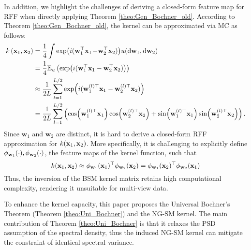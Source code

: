 In addition, we highlight the challenges of deriving a closed-form feature map for RFF when directly applying Theorem \ref{theo:Gen_Bochner_old}. According to Theorem \ref{theo:Gen_Bochner_old}, the kernel can be approximated via \MakeUppercase{mc} as follows:
\begin{equation}
\begin{aligned}
k\left({\mathbf x}_1, {\mathbf x}_2\right) &  = \frac{1}{4} \int \exp(i({\mathbf w}_1^{\top} {\mathbf x}_1 \! - \! {\mathbf w}_2^{\top} {\mathbf x}_2))  u(\mathrm{d}{\mathbf w}_1, \mathrm{d}{\mathbf w}_2) \\
&= \frac{1}{4} \mathbb{E}_u \left( \exp(i({\mathbf w}_1^{\top} {\mathbf x}_1 - {\mathbf w}_2^{\top} {\mathbf x}_2)) \right)\\
&\approx \frac{1}{2 L} \sum_{l=1}^{L/2} \exp(i({\mathbf w}_1^{(l)\top} {\mathbf x}_1 - {\mathbf w}_2^{(l)\top} {\mathbf x}_2))  \\
&= \frac{1}{2 L} \sum_{l=1}^{L/2} \left(\cos({\mathbf w}_{1}^{(l)\top} {\mathbf x}_1)\cos({\mathbf w}_{2}^{(l)\top} {\mathbf x}_2) + \sin({\mathbf w}_{1}^{(l)\top} {\mathbf x}_1)\sin({\mathbf w}_{2}^{(l)\top} {\mathbf x}_2) \right).
\end{aligned}
\end{equation}
Since \(\mathbf{w}_1\) and \(\mathbf{w}_2\) are distinct, it is hard to derive a closed-form  RFF approximation for $k({\mathbf x}_1, {\mathbf x}_2)$. More specifically, it is challenging to explicitly define $\phi_{{\mathbf w}_1}(\cdot), \phi_{{\mathbf w}_2}(\cdot)$, the feature maps of the kernel function, such that 
\begin{equation}
    k({\mathbf x}_1, {\mathbf x}_2) \approx \phi_{{\mathbf w}_1}({\mathbf x}_1)^\top \phi_{{\mathbf w}_2}({\mathbf x}_2) = \phi_{{\mathbf w}_1}({\mathbf x}_2)^\top \phi_{{\mathbf w}_2}({\mathbf x}_1)
\end{equation}
Thus, the inversion of the \MakeUppercase{bsm} kernel matrix retains high computational complexity, rendering it unsuitable for multi-view data. 

\begin{remark}
    To enhance the kernel capacity, this paper proposes the Universal Bochner’s Theorem (Theorem \ref{theo:Uni_Bochner}) and the NG-SM kernel.  The main contribution of Theorem \ref{theo:Uni_Bochner} is that it relaxes the PSD assumption of the spectral density, thus the induced NG-SM kernel can mitigate the constraint of identical spectral variance.
\end{remark}

